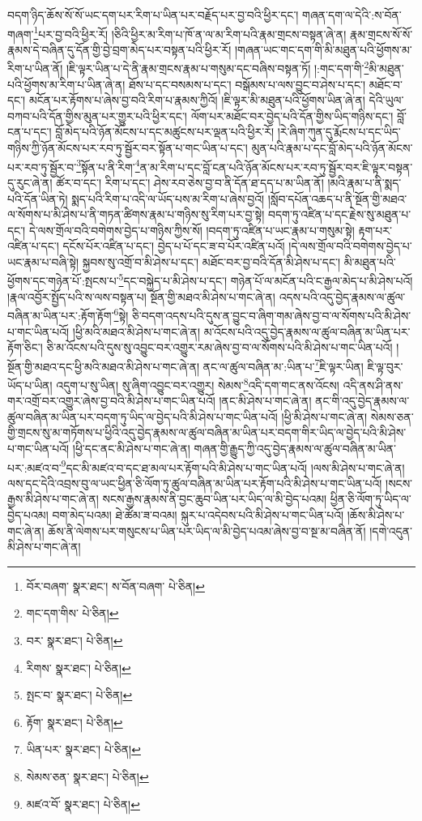 བདག་ཉིད་ཆོས་སོ་སོ་ཡང་དག་པར་རིག་པ་ཡིན་པར་བརྗོད་པར་བྱ་བའི་ཕྱིར་དང་། གཞན་དག་ལ་དེའི་:ས་བོན་གཞག་\footnote{བོར་བཞག་  སྣར་ཐང་། ས་བོན་བཞག་  པེ་ཅིན། }པར་བྱ་བའི་ཕྱིར་རོ། །ཅིའི་ཕྱིར་མ་རིག་པ་ཁོ་ན་ལ་མ་རིག་པའི་རྣམ་གྲངས་བསྟན་ཞེ་ན། རྣམ་གྲངས་སོ་སོ་རྣམས་དེ་བཞིན་དུ་དོན་གྱི་བྱེ་བྲག་མེད་པར་བསྟན་པའི་ཕྱིར་རོ། །གཞན་ཡང་གང་དག་གི་མི་མཐུན་པའི་ཕྱོགས་མ་རིག་པ་ཡིན་ནོ། །ཇི་ལྟར་ཡིན་པ་དེ་ནི་རྣམ་གྲངས་རྣམ་པ་གསུམ་དང་བཞིས་བསྟན་ཏོ། །:གང་དག་གི་\footnote{གང་དག་གིས་  པེ་ཅིན། }མི་མཐུན་པའི་ཕྱོགས་མ་རིག་པ་ཡིན་ཞེ་ན། ཐོས་པ་དང་བསམས་པ་དང་། བསྒོམས་པ་ལས་བྱུང་བ་ཤེས་པ་དང་། མཐོང་བ་དང་། མངོན་པར་རྟོགས་པ་ཞེས་བྱ་བའི་རིག་པ་རྣམས་ཀྱིའོ། །ཇི་ལྟར་མི་མཐུན་པའི་ཕྱོགས་ཡིན་ཞེ་ན། དེའི་ཡུལ་བཀབ་པའི་དོན་གྱིས་མུན་པར་གྱུར་པའི་ཕྱིར་དང་། ལོག་པར་མཐོང་བར་བྱེད་པའི་དོན་གྱིས་ཡིད་གཉིས་དང་། བློ་ངན་པ་དང་། བློ་མེད་པའི་ཉོན་མོངས་པ་དང་མཚུངས་པར་ལྡན་པའི་ཕྱིར་རོ། །རེ་ཞིག་ཀུན་དུ་རྨོངས་པ་དང་ཡིད་གཉིས་ཀྱི་ཉོན་མོངས་པར་རབ་ཏུ་སྦྱོར་བར་སྟོན་པ་གང་ཡིན་པ་དང་། མུན་པའི་རྣམ་པ་དང་བློ་མེད་པའི་ཉོན་མོངས་པར་རབ་ཏུ་སྦྱོར་བ་\footnote{བར་  སྣར་ཐང་།  པེ་ཅིན། }སྟོན་པ་ནི་རིག་\footnote{རིགས་  སྣར་ཐང་།  པེ་ཅིན། }ན་མ་རིག་པ་དང་བློ་ངན་པའི་ཉོན་མོངས་པར་རབ་ཏུ་སྦྱོར་བར་ཇི་ལྟར་བསྟན་དུ་རུང་ཞེ་ན། ཚོར་བ་དང་། རིག་པ་དང་། ཤེས་རབ་ཅེས་བྱ་བ་ནི་དོན་ཐ་དད་པ་མ་ཡིན་ནོ། །མའི་རྣམ་པ་ནི་སྨད་པའི་དོན་ཡིན་ཏེ། སྨད་པའི་རིག་པ་འདི་ལ་ཡོད་པས་མ་རིག་པ་ཞེས་བྱའོ། །སློབ་དཔོན་འཆད་པ་ནི་སྔོན་གྱི་མཐའ་ལ་སོགས་པ་མི་ཤེས་པ་ནི་གཏན་ཚིགས་རྣམ་པ་གཉིས་སུ་རིག་པར་བྱ་སྟེ། བདག་ཏུ་འཛིན་པ་དང་རྗེས་སུ་མཐུན་པ་དང་། དེ་ལས་གྲོལ་བའི་བགེགས་བྱེད་པ་གཉིས་ཀྱིས་སོ། །བདག་ཏུ་འཛིན་པ་ཡང་རྣམ་པ་གསུམ་སྟེ། རྟག་པར་འཛིན་པ་དང་། དངོས་པོར་འཛིན་པ་དང་། བྱེད་པ་པོ་དང་ཟ་བ་པོར་འཛིན་པའོ། །དེ་ལས་གྲོལ་བའི་བགེགས་བྱེད་པ་ཡང་རྣམ་པ་བཞི་སྟེ། སྐྱབས་སུ་འགྲོ་བ་མི་ཤེས་པ་དང་། མཐོང་བར་བྱ་བའི་དོན་མི་ཤེས་པ་དང་། མི་མཐུན་པའི་ཕྱོགས་དང་གཉེན་པོ་:སྤངས་པ་\footnote{སྤང་བ་  སྣར་ཐང་།  པེ་ཅིན། }དང་བསྐྱེད་པ་མི་ཤེས་པ་དང་། གཉེན་པོ་ལ་མངོན་པའི་ང་རྒྱལ་མེད་པ་མི་ཤེས་པའོ། །རྣལ་འབྱོར་སྤྱོད་པའི་ས་ལས་བསྟན་པ། སྔོན་གྱི་མཐའ་མི་ཤེས་པ་གང་ཞེ་ན། འདས་པའི་འདུ་བྱེད་རྣམས་ལ་ཚུལ་བཞིན་མ་ཡིན་པར་:རྟོག་རྟོག་\footnote{རྟོག་  སྣར་ཐང་།  པེ་ཅིན། }སྟེ། ཅི་བདག་འདས་པའི་དུས་ན་བྱུང་བ་ཞིག་གམ་ཞེས་བྱ་བ་ལ་སོགས་པའི་མི་ཤེས་པ་གང་ཡིན་པའོ། །ཕྱི་མའི་མཐའ་མི་ཤེས་པ་གང་ཞེ་ན། མ་འོངས་པའི་འདུ་བྱེད་རྣམས་ལ་ཚུལ་བཞིན་མ་ཡིན་པར་རྟོག་ཅིང་། ཅི་མ་འོངས་པའི་དུས་སུ་འབྱུང་བར་འགྱུར་རམ་ཞེས་བྱ་བ་ལ་སོགས་པའི་མི་ཤེས་པ་གང་ཡིན་པའོ། །སྔོན་གྱི་མཐའ་དང་ཕྱི་མའི་མཐའ་མི་ཤེས་པ་གང་ཞེ་ན། ནང་ལ་ཚུལ་བཞིན་མ་:ཡིན་པ་\footnote{ཡིན་པར་  སྣར་ཐང་།  པེ་ཅིན། }ཇི་ལྟར་ཡིན། ཇི་ལྟ་བུར་ཡོད་པ་ཡིན། འདུག་པ་སུ་ཡིན། སུ་ཞིག་འབྱུང་བར་འགྱུར། སེམས་\footnote{སེམས་ཅན་  སྣར་ཐང་།  པེ་ཅིན། }འདི་དག་གང་ནས་འོངས། འདི་ནས་ཤི་ནས་གར་འགྲོ་བར་འགྱུར་ཞེས་བྱ་བའི་མི་ཤེས་པ་གང་ཡིན་པའོ། །ནང་མི་ཤེས་པ་གང་ཞེ་ན། ནང་གི་འདུ་བྱེད་རྣམས་ལ་ཚུལ་བཞིན་མ་ཡིན་པར་བདག་ཏུ་ཡིད་ལ་བྱེད་པའི་མི་ཤེས་པ་གང་ཡིན་པའོ། །ཕྱི་མི་ཤེས་པ་གང་ཞེ་ན། སེམས་ཅན་གྱི་གྲངས་སུ་མ་གཏོགས་པ་ཕྱིའི་འདུ་བྱེད་རྣམས་ལ་ཚུལ་བཞིན་མ་ཡིན་པར་བདག་གིར་ཡིད་ལ་བྱེད་པའི་མི་ཤེས་པ་གང་ཡིན་པའོ། །ཕྱི་དང་ནང་མི་ཤེས་པ་གང་ཞེ་ན། གཞན་གྱི་རྒྱུད་ཀྱི་འདུ་བྱེད་རྣམས་ལ་ཚུལ་བཞིན་མ་ཡིན་པར་:མཛའ་བ་\footnote{མཛའ་བོ་  སྣར་ཐང་།  པེ་ཅིན། }དང་མི་མཛའ་བ་དང་ཐ་མལ་པར་རྟོག་པའི་མི་ཤེས་པ་གང་ཡིན་པའོ། །ལས་མི་ཤེས་པ་གང་ཞེ་ན། ལས་དང་དེའི་འབྲས་བུ་ལ་ཡང་ཕྱིན་ཅི་ལོག་ཏུ་ཚུལ་བཞིན་མ་ཡིན་པར་རྟོག་པའི་མི་ཤེས་པ་གང་ཡིན་པའོ། །སངས་རྒྱས་མི་ཤེས་པ་གང་ཞེ་ན། སངས་རྒྱས་རྣམས་ནི་བྱང་ཆུབ་ཡིན་པར་ཡིད་ལ་མི་བྱེད་པའམ། ཕྱིན་ཅི་ལོག་ཏུ་ཡིད་ལ་བྱེད་པའམ། བག་མེད་པའམ། ཐེ་ཚོམ་ཟ་བའམ། སྐུར་པ་འདེབས་པའི་མི་ཤེས་པ་གང་ཡིན་པའོ། །ཆོས་མི་ཤེས་པ་གང་ཞེ་ན། ཆོས་ནི་ལེགས་པར་གསུངས་པ་ཡིན་པར་ཡིད་ལ་མི་བྱེད་པའམ་ཞེས་བྱ་བ་སྔ་མ་བཞིན་ནོ། །དགེ་འདུན་མི་ཤེས་པ་གང་ཞེ་ན། 